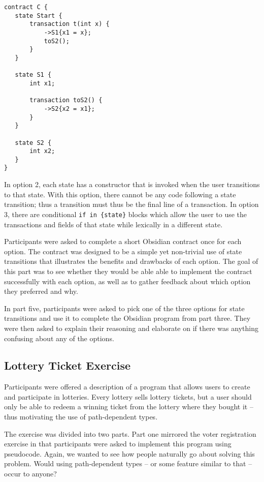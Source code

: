 \documentclass[sigplan,10pt,review]{acmart}\settopmatter{printfolios=true}
\begin{document}
\begin{lstlisting}[caption={One option for state transitions},captionpos=b]
contract C {
   state Start {
       transaction t(int x) {
           ->S1{x1 = x};
           toS2();
       }
   }

   state S1 {
       int x1;

       transaction toS2() {
           ->S2{x2 = x1};
       }
   }

   state S2 {
       int x2;
   }
}
\end{lstlisting}

In option 2, each state has a constructor that is invoked when the user transitions to that state. With this
option, there cannot be any code following a state transition; thus a transition must thus be the final line of a 
transaction. In option 3, there are conditional \texttt{\small{if in \{state\}}} blocks which allow the user
to use the transactions and fields of that state while lexically in a different state. 

Participants were asked to complete a short Obsidian contract once for each option. The contract was 
designed to be a simple yet non-trivial use of state transitions that illustrates the benefits and drawbacks of each 
option. The goal of this part was to see whether they would be able able to implement the 
contract successfully with each option, as well as to gather feedback about which option they preferred and why.

In part five, participants were asked to pick one of the three options for state transitions and use it to complete 
the Obsidian program from part three. They were then asked to explain their reasoning and elaborate on if 
there was anything confusing about any of the options. 

\subsection{Lottery Ticket Exercise}
	
Participants were offered a description of a program that allows users to create and participate in lotteries. Every 
lottery sells lottery tickets, but a user should only be able to redeem a winning ticket from the lottery where they 
bought it -- thus motivating the use of path-dependent types. 

The exercise was divided into two parts. Part one mirrored the voter registration exercise in that participants were 
asked to implement this program using pseudocode. Again, we wanted to see how people naturally go about 
solving this problem. Would using path-dependent types -- or some feature similar to that -- occur to anyone?
	
\end{document}
